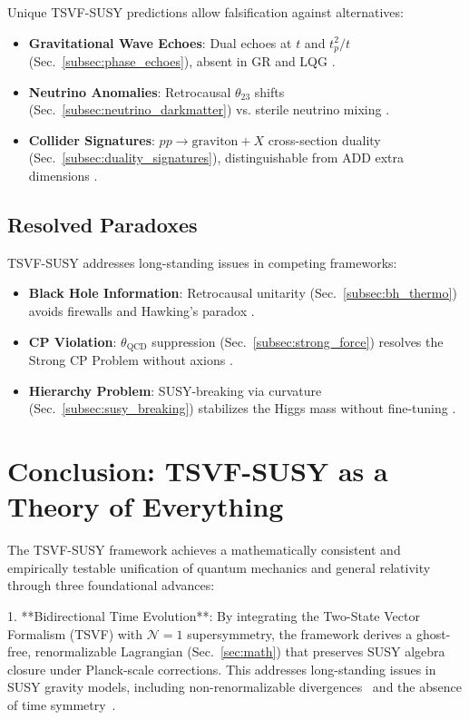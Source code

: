 \documentclass[twocolumn,superscriptaddress,floatfix]{revtex4-2}
\begin{document}
Unique TSVF-SUSY predictions allow falsification against alternatives:
\begin{itemize}
\item \textbf{Gravitational Wave Echoes}: Dual echoes at \( t \) and \( t_p^2/t \) (Sec.~\ref{subsec:phase_echoes}), absent in GR and LQG \cite{Abedi2017}.  
\item \textbf{Neutrino Anomalies}: Retrocausal \( \theta_{23} \) shifts (Sec.~\ref{subsec:neutrino_darkmatter}) vs. sterile neutrino mixing \cite{Dentler2018}.  
\item \textbf{Collider Signatures}: \( pp \to \text{graviton} + X \) cross-section duality (Sec.~\ref{subsec:duality_signatures}), distinguishable from ADD extra dimensions \cite{ArkaniHamed1998}.  
\end{itemize}

\subsection{Resolved Paradoxes}
\label{subsec:paradoxes}

TSVF-SUSY addresses long-standing issues in competing frameworks:
\begin{itemize}
\item \textbf{Black Hole Information}: Retrocausal unitarity (Sec.~\ref{subsec:bh_thermo}) avoids firewalls \cite{Almheiri2013} and Hawking's paradox \cite{Hawking1976}.  
\item \textbf{CP Violation}: \(\theta_{\text{QCD}}\) suppression (Sec.~\ref{subsec:strong_force}) resolves the Strong CP Problem without axions \cite{Peccei1977}.  
\item \textbf{Hierarchy Problem}: SUSY-breaking via curvature (Sec.~\ref{subsec:susy_breaking}) stabilizes the Higgs mass without fine-tuning \cite{Giudice2008}.  
\end{itemize}

\section{Conclusion: TSVF-SUSY as a Theory of Everything}  
\label{sec:conclusion}  

The TSVF-SUSY framework achieves a mathematically consistent and empirically testable unification of quantum mechanics and general relativity through three foundational advances:  

1. **Bidirectional Time Evolution**: By integrating the Two-State Vector Formalism (TSVF) with $\mathcal{N}=1$ supersymmetry, the framework derives a ghost-free, renormalizable Lagrangian (Sec.~\ref{sec:math}) that preserves SUSY algebra closure under Planck-scale corrections. This addresses long-standing issues in SUSY gravity models, including non-renormalizable divergences~\cite{Nicolai1984} and the absence of time symmetry~\cite{Page1994}.  
\end{document}
